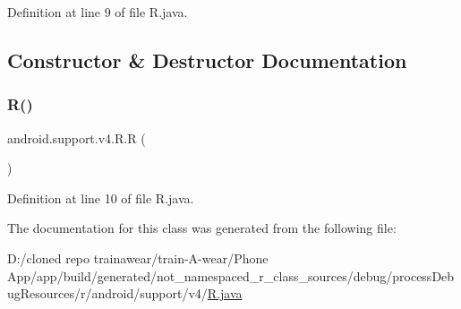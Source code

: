 Definition at line 9 of file R.\+java.



\subsection{Constructor \& Destructor Documentation}
\mbox{\label{classandroid_1_1support_1_1v4_1_1_r_a254130e1af6c1572edc11c48990a7e01}} 
\subsubsection{\texorpdfstring{R()}{R()}}
{\footnotesize\ttfamily android.\+support.\+v4.\+R.\+R (\begin{DoxyParamCaption}{ }\end{DoxyParamCaption})\hspace{0.3cm}{\ttfamily [private]}}



Definition at line 10 of file R.\+java.


\begin{DoxyCode}{0}

\end{DoxyCode}


The documentation for this class was generated from the following file\+:\begin{DoxyCompactItemize}
\item 
D\+:/cloned repo trainawear/train-\/\+A-\/wear/\+Phone App/app/build/generated/not\+\_\+namespaced\+\_\+r\+\_\+class\+\_\+sources/debug/process\+Debug\+Resources/r/android/support/v4/\mbox{\hyperlink{process_debug_resources_2r_2android_2support_2v4_2_r_8java}{R.\+java}}\end{DoxyCompactItemize}
